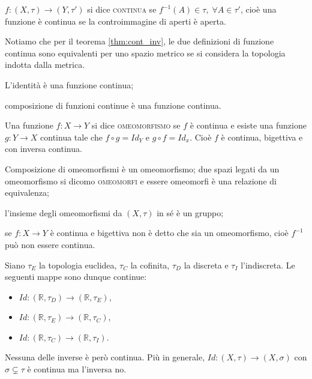 \begin{defn}
    $f: (X, \tau) \rightarrow (Y, \tau')$ si dice \textsc{continua} se
    ${f^{-1}(A) \in \tau,}\; {\forall A \in \tau'}$, cioè una funzione \`e
    continua se la controimmagine di aperti \`e aperta.
\end{defn}

Notiamo che per il teorema \ref{thm:cont_inv}, le due
definizioni di funzione continua sono equivalenti per uno spazio metrico se si
considera la topologia indotta dalla metrica.

\begin{thm}
    \begin{nlist}
        \item L'identità è una funzione continua;
        \item composizione di funzioni continue è una funzione continua.
    \end{nlist}
\end{thm}

\begin{defn}
    Una funzione $f: X \rightarrow Y$ si dice \textsc{omeomorfismo} se $f$ è
    continua e esiste una funzione $g:Y\rightarrow X$ continua tale che $f \circ
    g = Id_Y$ e $g \circ f = Id_x$. Cio\`e $f$ \`e continua, bigettiva e con
    inversa continua.
\end{defn}

\begin{oss}
	\begin{nlist}
	\item Composizione di omeomorfismi è un omeomorfismo; due spazi legati da un
	omeomorfismo si dicomo \textsc{omeomorfi} e essere omeomorfi è una relazione
	di equivalenza;
	\item l'insieme degli omeomorfismi da $(X, \tau)$ in sé è un gruppo;
	\item se $f:X \rightarrow Y$ è continua e bigettiva non è detto che sia un
	omeomorfismo, cioè $f^{-1}$ può non essere continua.
    \marginpar{\warningsign}
\end{nlist}
\end{oss}

\begin{ex}
	Siano $\tau_E$ la topologia euclidea, $\tau_C$ la cofinita, $\tau_D$ la
	discreta e $\tau_I$ l'indiscreta. Le seguenti mappe sono dunque continue:
    \begin{itemize}
	\item $Id:(\mathbb{R}, \tau_D) \rightarrow (\mathbb{R}, \tau_E)$,
    \item $Id:(\mathbb{R}, \tau_E) \rightarrow (\mathbb{R}, \tau_C)$,
    \item $Id:(\mathbb{R}, \tau_C) \rightarrow (\mathbb{R}, \tau_I)$.
    \end{itemize}
    Nessuna delle inverse è però continua. Più in generale, $Id: (X, \tau)
    \rightarrow (X, \sigma)$ con $\sigma \subsetneq \tau$ è continua ma
    l'inversa no.
\end{ex}

